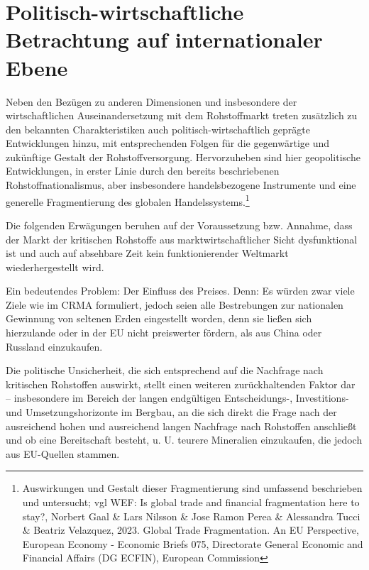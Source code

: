 \documentclass[12pt,a4paper,oneside]{book} %
\begin{document}

\chapter{Politisch-wirtschaftliche Betrachtung auf internationaler Ebene}

Neben den Bezügen zu anderen Dimensionen und insbesondere der wirtschaftlichen Auseinandersetzung mit dem Rohstoffmarkt treten zusätzlich zu den bekannten Charakteristiken auch politisch-wirtschaftlich geprägte Entwicklungen hinzu, mit entsprechenden Folgen für die gegenwärtige und zukünftige Gestalt der Rohstoffversorgung. Hervorzuheben sind hier  geopolitische Entwicklungen, in erster Linie durch den bereits beschriebenen Rohstoffnationalismus, aber insbesondere handelsbezogene Instrumente und eine generelle Fragmentierung des globalen Handelssystems.\footnote{Auswirkungen und Gestalt dieser Fragmentierung sind umfassend beschrieben und untersucht; vgl WEF: Is global trade and financial fragmentation here to stay?,  Norbert Gaal \& Lars Nilsson \& Jose Ramon Perea \& Alessandra Tucci \& Beatriz Velazquez, 2023. Global Trade Fragmentation. An EU Perspective, European Economy - Economic Briefs 075, Directorate General Economic and Financial Affairs (DG ECFIN), European Commission}

Die folgenden Erwägungen beruhen auf der Voraussetzung bzw. Annahme, dass der Markt der kritischen Rohstoffe aus marktwirtschaftlicher Sicht dysfunktional ist und auch auf absehbare Zeit kein funktionierender Weltmarkt wiederhergestellt wird.

Ein bedeutendes Problem: Der Einfluss des Preises. Denn: Es würden zwar viele Ziele wie im CRMA formuliert, jedoch seien alle Bestrebungen zur nationalen Gewinnung von seltenen Erden eingestellt worden, denn sie ließen sich \glqq hierzulande oder in der EU nicht preiswerter fördern, als aus China oder Russland einzukaufen\grqq.\autocite{VDI Nachrichten: Seltene Erden: Deutschland importiert lieber, als selbst zu fördern}

Die politische Unsicherheit, die sich entsprechend auf die Nachfrage nach kritischen Rohstoffen auswirkt, stellt einen weiteren zurückhaltenden Faktor dar -- insbesondere im Bereich der langen endgültigen Entscheidungs-, Investitions- und Umsetzungshorizonte im Bergbau, an die sich direkt die Frage nach der ausreichend hohen und ausreichend langen Nachfrage nach Rohstoffen anschließt und ob eine Bereitschaft besteht, u. U. teurere Mineralien einzukaufen, die jedoch aus EU-Quellen stammen.
\end{document}

